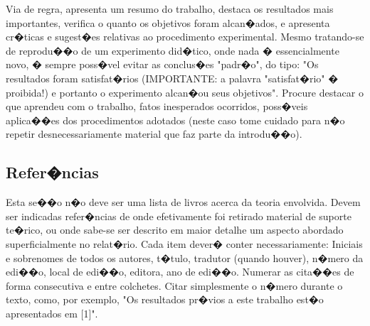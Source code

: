 \documentclass[conference]{IEEEtran}
\begin{document}
Via de regra, apresenta um resumo do trabalho, destaca os resultados mais importantes, verifica o quanto os objetivos foram alcan�ados, e apresenta cr�ticas e sugest�es relativas ao procedimento experimental. Mesmo tratando-se de reprodu��o de um experimento did�tico, onde nada � essencialmente novo, � sempre poss�vel evitar as conclus�es "padr�o", do tipo: "Os resultados foram satisfat�rios (IMPORTANTE: a palavra "satisfat�rio" � proibida!) e portanto o experimento alcan�ou seus objetivos". Procure destacar o que aprendeu com o trabalho, fatos inesperados ocorridos, poss�veis aplica��es dos procedimentos adotados (neste caso tome cuidado para n�o repetir desnecessariamente material que faz parte da introdu��o).

\subsection{Refer�ncias}
Esta se��o n�o deve ser uma lista de livros acerca da teoria envolvida. Devem ser indicadas refer�ncias de onde efetivamente foi retirado material de suporte te�rico, ou onde sabe-se ser descrito em maior detalhe um aspecto abordado superficialmente no relat�rio. Cada item dever� conter necessariamente: Iniciais e sobrenomes de todos os autores, t�tulo, tradutor (quando houver), n�mero da edi��o, local de edi��o, editora, ano de edi��o.
Numerar as cita��es de forma consecutiva e entre colchetes. Citar simplesmente o n�mero durante o texto, como, por exemplo, "Os resultados pr�vios a este trabalho est�o apresentados em [1]".

%
\end{document}
